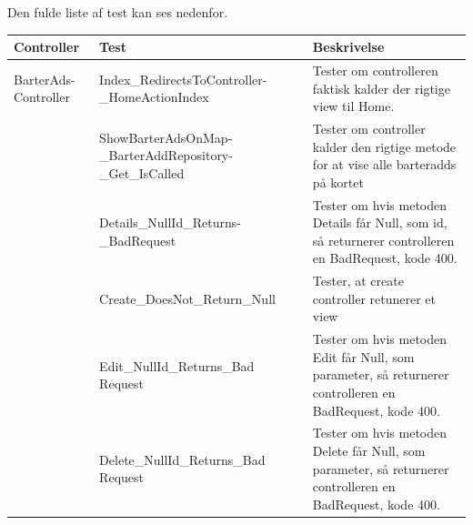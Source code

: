 Den fulde liste af test kan ses nedenfor.
\setlength{\arrayrulewidth}{0.3mm}
\setlength{\tabcolsep}{2pt}
\renewcommand{\arraystretch}{1.5}
\begin{table}[H]
	\begin{tabular}{ | p{3.0cm} | p{5.5cm} | p{8.0cm} | }
		\hline
		\textbf{Controller} & \textbf{Test} & \textbf{Beskrivelse} \\
		\hline
		BarterAds-Controller &  Index\_RedirectsToController-\_HomeActionIndex & Tester om controlleren faktisk kalder der rigtige view til Home. \\
		
		& ShowBarterAdsOnMap-\_BarterAddRepository-\_Get\_IsCalled & Tester om controller kalder den rigtige metode for at vise alle barteradds på kortet\\
	
		& Details\_NullId\_Returns-\_BadRequest & Tester om hvis metoden Details får Null, som id, så returnerer controlleren en BadRequest, kode 400. \\
		&Create\_DoesNot\_Return\_Null& Tester, at create controller retunerer et view \\
		& Edit\_NullId\_Returns\_Bad
		Request &  Tester om hvis metoden Edit får Null, som parameter, så returnerer controlleren en BadRequest, kode 400. \\
		& Delete\_NullId\_Returns\_Bad
		Request & Tester om hvis metoden Delete får Null, som parameter, så returnerer controlleren en BadRequest, kode 400. \\
		\hline
		

\end{tabular}
\end{table}
